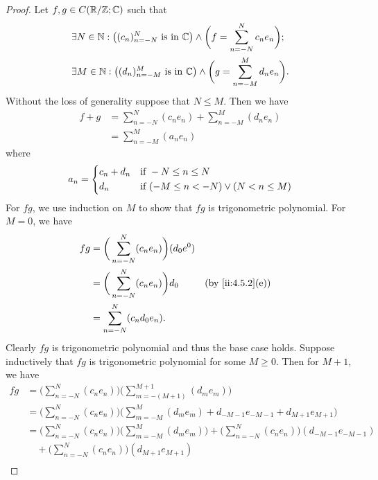 \begin{proof}
  Let \(f, g \in C(\mathbb{R} / \mathbb{Z} ; \mathbb{C})\) such that
  \begin{align*}
     & \exists N \in \mathbb{N} : \big((c_n)_{n = -N}^N \text{ is in } \mathbb{C}\big) \land \bigg(f = \sum_{n = -N}^N c_n e_n\bigg); \\
     & \exists M \in \mathbb{N} : \big((d_n)_{n = -M}^M \text{ is in } \mathbb{C}\big) \land \bigg(g = \sum_{n = -M}^M d_n e_n\bigg).
  \end{align*}
  Without the loss of generality suppose that \(N \leq M\).
  Then we have
  \begin{align*}
    f + g & = \sum_{n = -N}^N (c_n e_n) + \sum_{n = -M}^M (d_n e_n) \\
          & = \sum_{n = -M}^M (a_n e_n)
  \end{align*}
  where
  \[
    a_n = \begin{dcases}
      c_n + d_n & \text{if } -N \leq n \leq N                     \\
      d_n       & \text{if } (-M \leq n < -N) \lor (N < n \leq M)
    \end{dcases}
  \]
  For \(fg\), we use induction on \(M\) to show that \(fg\) is trigonometric polynomial.
  For \(M = 0\), we have
  \begin{align*}
    fg & = \bigg(\sum_{n = -N}^N (c_n e_n)\bigg) (d_0 e^0)                       \\
       & = \bigg(\sum_{n = -N}^N (c_n e_n)\bigg) d_0       &  & \by{ii:4.5.2}[e] \\
       & = \sum_{n = -N}^N (c_n d_0 e_n).
  \end{align*}
  Clearly \(fg\) is trigonometric polynomial and thus the base case holds.
  Suppose inductively that \(fg\) is trigonometric polynomial for some \(M \geq 0\).
  Then for \(M + 1\), we have
  \begin{align*}
    f g & = \bigg(\sum_{n = -N}^N (c_n e_n)\bigg) \bigg(\sum_{m = -(M + 1)}^{M + 1} (d_m e_m)\bigg)                                                        \\
        & = \bigg(\sum_{n = -N}^N (c_n e_n)\bigg) \bigg(\sum_{m = -M}^M (d_m e_m) + d_{-M - 1} e_{-M - 1} + d_{M + 1} e_{M + 1}\bigg)                      \\
        & = \bigg(\sum_{n = -N}^N (c_n e_n)\bigg) \bigg(\sum_{m = -M}^M (d_m e_m)\bigg) + \bigg(\sum_{n = -N}^N (c_n e_n)\bigg) (d_{-M - 1} e_{-M - 1})    \\
        & \quad + \bigg(\sum_{n = -N}^N (c_n e_n)\bigg) (d_{M + 1} e_{M + 1})                                                                              \\

\end{align*}
\end{proof}
